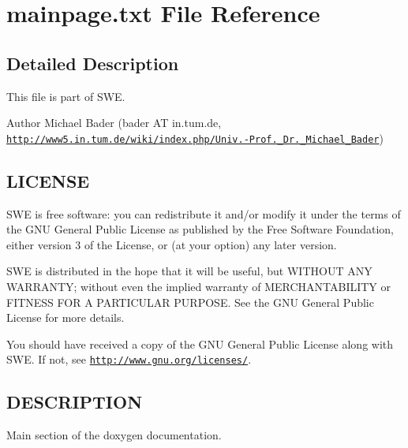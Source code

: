 \hypertarget{mainpage_8txt}{\section{mainpage.\-txt File Reference}
\label{mainpage_8txt}
}


\subsection{Detailed Description}
This file is part of S\-W\-E.

\begin{DoxyAuthor}{Author}
Michael Bader (bader A\-T in.\-tum.\-de, \href{http://www5.in.tum.de/wiki/index.php/Univ.-Prof._Dr._Michael_Bader}{\tt http\-://www5.\-in.\-tum.\-de/wiki/index.\-php/\-Univ.-\/\-Prof.\-\_\-\-Dr.\-\_\-\-Michael\-\_\-\-Bader})
\end{DoxyAuthor}
\hypertarget{Writer_8hh_LICENSE}{}\subsection{L\-I\-C\-E\-N\-S\-E}\label{Writer_8hh_LICENSE}
S\-W\-E is free software\-: you can redistribute it and/or modify it under the terms of the G\-N\-U General Public License as published by the Free Software Foundation, either version 3 of the License, or (at your option) any later version.

S\-W\-E is distributed in the hope that it will be useful, but W\-I\-T\-H\-O\-U\-T A\-N\-Y W\-A\-R\-R\-A\-N\-T\-Y; without even the implied warranty of M\-E\-R\-C\-H\-A\-N\-T\-A\-B\-I\-L\-I\-T\-Y or F\-I\-T\-N\-E\-S\-S F\-O\-R A P\-A\-R\-T\-I\-C\-U\-L\-A\-R P\-U\-R\-P\-O\-S\-E. See the G\-N\-U General Public License for more details.

You should have received a copy of the G\-N\-U General Public License along with S\-W\-E. If not, see \href{http://www.gnu.org/licenses/}{\tt http\-://www.\-gnu.\-org/licenses/}.\hypertarget{NetCdfWriter_8hh_DESCRIPTION}{}\subsection{D\-E\-S\-C\-R\-I\-P\-T\-I\-O\-N}\label{NetCdfWriter_8hh_DESCRIPTION}
Main section of the doxygen documentation. 